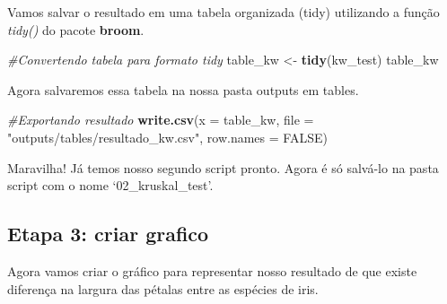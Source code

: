\documentclass[
]{book}
\newenvironment{Shaded}{\begin{snugshade}}{\end{snugshade}}
\newcommand{\AttributeTok}[1]{\textcolor[rgb]{0.13,0.29,0.53}{#1}}
\newcommand{\CommentTok}[1]{\textcolor[rgb]{0.56,0.35,0.01}{\textit{#1}}}
\newcommand{\ConstantTok}[1]{\textcolor[rgb]{0.56,0.35,0.01}{#1}}
\newcommand{\FunctionTok}[1]{\textcolor[rgb]{0.13,0.29,0.53}{\textbf{#1}}}
\newcommand{\NormalTok}[1]{#1}
\newcommand{\OtherTok}[1]{\textcolor[rgb]{0.56,0.35,0.01}{#1}}
\newcommand{\SpecialCharTok}[1]{\textcolor[rgb]{0.81,0.36,0.00}{\textbf{#1}}}
\newcommand{\StringTok}[1]{\textcolor[rgb]{0.31,0.60,0.02}{#1}}
\begin{document}
\begin{Shaded}
\end{Shaded}

Vamos salvar o resultado em uma tabela organizada (tidy) utilizando a função \emph{tidy()} do pacote \textbf{broom}.

\begin{Shaded}
\begin{Highlighting}[]

\CommentTok{\#Convertendo tabela para formato tidy}
\NormalTok{table\_kw }\OtherTok{\textless{}{-}} \FunctionTok{tidy}\NormalTok{(kw\_test)}
\NormalTok{table\_kw}
\end{Highlighting}
\end{Shaded}

Agora salvaremos essa tabela na nossa pasta outputs em tables.

\begin{Shaded}
\begin{Highlighting}[]

\CommentTok{\#Exportando resultado}
\FunctionTok{write.csv}\NormalTok{(}\AttributeTok{x =}\NormalTok{ table\_kw,                                 }
          \AttributeTok{file =} \StringTok{"outputs/tables/resultado\_kw.csv"}\NormalTok{,}
          \AttributeTok{row.names =} \ConstantTok{FALSE}\NormalTok{)}
\end{Highlighting}
\end{Shaded}

Maravilha! Já temos nosso segundo script pronto. Agora é só salvá-lo na pasta script com o nome `02\_kruskal\_test'.

\hypertarget{etapa-3-criar-grafico}{%
\subsection{Etapa 3: criar grafico}\label{etapa-3-criar-grafico}}

Agora vamos criar o gráfico para representar nosso resultado de que existe diferença na largura das pétalas entre as espécies de iris.
\end{document}
